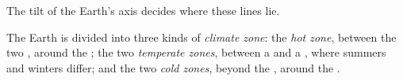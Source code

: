 The tilt of the Earth's axis decides where these lines lie.

\begin{definition}\label{def:g5:weather-and-climate:climate-zone}
The Earth is divided into three kinds of \emph{climate zone}: the \emph{hot zone}, between the two , around the ;
the two \emph{temperate zones}, between a  and a , where
summers and winters differ; and the two \emph{cold zones}, beyond the
, around the .
\end{definition}

